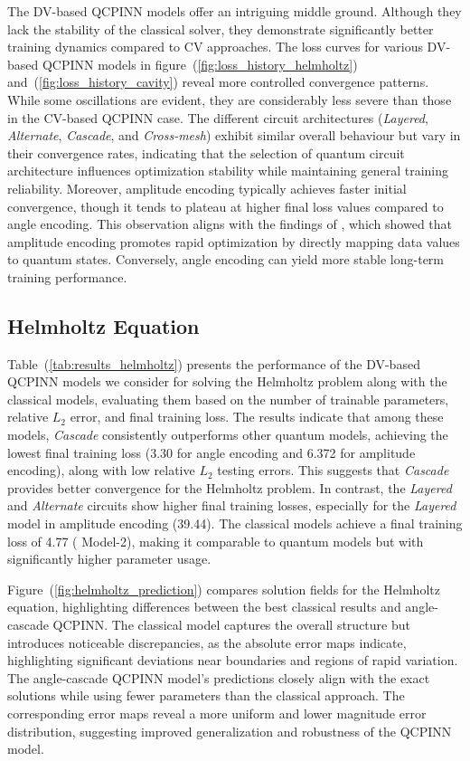 The DV-based QCPINN models offer an intriguing middle ground. Although they lack the stability of the classical solver, they demonstrate significantly better training dynamics compared to CV approaches. The loss curves for various DV-based  QCPINN models in figure~(\ref{fig:loss_history_helmholtz}) and~(\ref{fig:loss_history_cavity}) reveal more controlled convergence patterns. While some oscillations are evident, they are considerably less severe than those in the CV-based QCPINN case. The different circuit architectures (\textit{Layered}, \textit{Alternate}, \textit{Cascade}, and \textit{Cross-mesh}) exhibit similar overall behaviour but vary in their convergence rates, indicating that the selection of quantum circuit architecture influences optimization stability while maintaining general training reliability. Moreover, amplitude encoding typically achieves faster initial convergence, though it tends to plateau at higher final loss values compared to angle encoding. This observation aligns with the findings of \cite{suzuki2020analysis}, which showed that amplitude encoding promotes rapid optimization by directly mapping data values to quantum states. Conversely, angle encoding can yield more stable long-term training performance. 


\subsection{Helmholtz Equation}
\label{subsec:results_helmholtz}

Table~(\ref{tab:results_helmholtz}) presents the performance of the DV-based QCPINN models we consider for solving the Helmholtz problem along with the classical models, evaluating them based on the number of trainable parameters, relative $L_2$ error, and final training loss. The results indicate that among these models, \textit{Cascade} consistently outperforms other quantum models, achieving the lowest final training loss (3.30 for angle encoding and 6.372 for amplitude encoding), along with low relative $L_2$ testing errors. This suggests that \textit{Cascade} provides better convergence for the Helmholtz problem. In contrast, the \textit{Layered} and \textit{Alternate} circuits show higher final training losses, especially for the \textit{Layered} model in amplitude encoding (39.44). The classical models achieve a final training loss of 4.77 ( Model-2), making it comparable to quantum models but with significantly higher parameter usage.

Figure~(\ref{fig:helmholtz_prediction}) compares solution fields for the Helmholtz equation, highlighting differences between the best classical results and angle-cascade QCPINN. The classical model captures the overall structure but introduces noticeable discrepancies, as the absolute error maps indicate, highlighting significant deviations near boundaries and regions of rapid variation. The angle-cascade QCPINN model's predictions closely align with the exact solutions while using fewer parameters than the classical approach. The corresponding error maps reveal a more uniform and lower magnitude error distribution, suggesting improved generalization and robustness of the QCPINN model.


